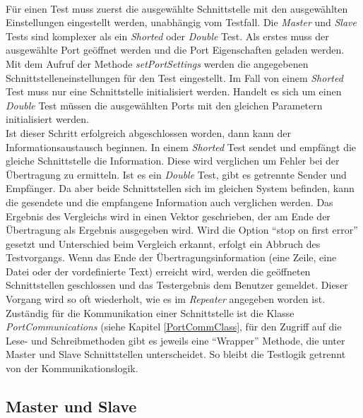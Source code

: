 \paragraph{}
Für einen Test muss zuerst die ausgewählte Schnittstelle mit den ausgewählten Einstellungen eingestellt werden, unabhängig vom Testfall. Die \textit{Master} und \textit{Slave} Tests sind komplexer als ein \textit{Shorted} oder \textit{Double} Test. Als erstes muss der ausgewählte Port geöffnet werden und die Port Eigenschaften geladen werden. Mit dem Aufruf der Methode \textit{setPortSettings} werden die angegebenen Schnittstelleneinstellungen für den Test eingestellt. Im Fall von einem \textit{Shorted} Test muss nur eine Schnittstelle initialisiert werden. Handelt es sich um einen \textit{Double} Test müssen die ausgewählten Ports mit den gleichen Parametern initialisiert werden.\\

Ist dieser Schritt erfolgreich abgeschlossen worden, dann kann der Informationsaustausch beginnen. In einem \textit{Shorted} Test sendet und empfängt die gleiche Schnittstelle die Information. Diese wird verglichen um Fehler bei der Übertragung zu ermitteln. Ist es ein \textit{Double} Test, gibt es getrennte Sender und Empfänger. Da aber beide Schnittstellen sich im gleichen System befinden, kann die gesendete und die empfangene Information auch verglichen werden. Das Ergebnis des Vergleichs wird in einen Vektor geschrieben, der am Ende der Übertragung als Ergebnis ausgegeben wird. Wird die Option "`stop on first error"' gesetzt und Unterschied beim Vergleich erkannt, erfolgt ein Abbruch des Testvorgangs. Wenn das Ende der Übertragungsinformation (eine Zeile, eine Datei oder der vordefinierte Text) erreicht wird, werden die geöffneten Schnittstellen geschlossen und das Testergebnis dem Benutzer gemeldet. Dieser Vorgang wird so oft wiederholt, wie es im \textit{Repeater} angegeben worden ist.\\

Zuständig für die Kommunikation einer Schnittstelle ist die Klasse \textit{PortCommunications} (siehe Kapitel \ref{PortCommClass}, für den Zugriff auf die Lese- und Schreibmethoden gibt es jeweils eine "`Wrapper"' Methode, die unter Master und Slave Schnittstellen unterscheidet. So bleibt die Testlogik getrennt von der Kommunikationslogik.

\subsection{Master und Slave}
